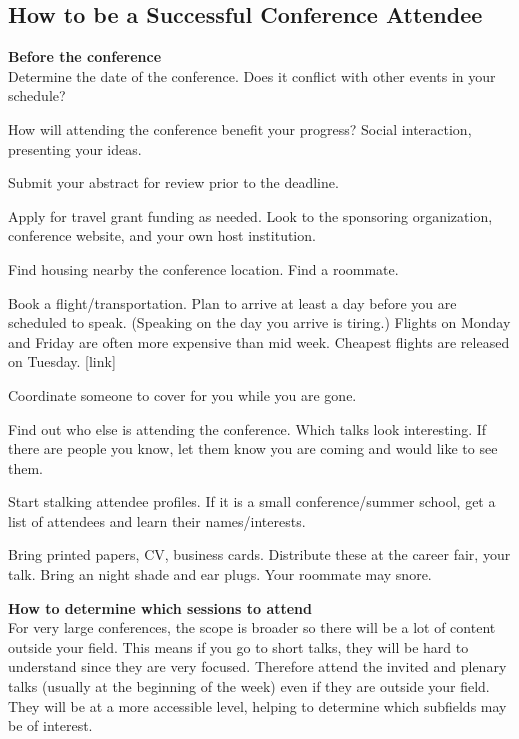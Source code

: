 \subsection{How to be a Successful Conference Attendee}



\textbf{Before the conference}\\

Determine the date of the conference. Does it conflict with other events in your schedule?

How will attending the conference benefit your progress? Social interaction, presenting your ideas.

Submit your abstract for review prior to the deadline.

Apply for travel grant funding as needed. Look to the sponsoring organization, conference website, and your own host institution.

Find housing nearby the conference location. Find a roommate.

Book a flight/transportation. Plan to arrive at least a day before you are scheduled to speak. (Speaking on the day you arrive is tiring.) Flights on Monday and Friday are often more expensive than mid week. Cheapest flights are released on Tuesday. [link]

Coordinate someone to cover for you while you are gone.

Find out who else is attending the conference. Which talks look interesting. If there are people you know, let them know you are coming and would like to see them.

Start stalking attendee profiles. If it is a small conference/summer school, get a list of attendees and learn their names/interests.

Bring printed papers, CV, business cards. Distribute these at the career fair, your talk. Bring an night shade and ear plugs. Your roommate may snore.

\textbf{How to determine which sessions to attend}\\

For very large conferences, the scope is broader so there will be a lot of content outside your field. This means if you go to short talks, they will be hard to understand since they are very focused. Therefore attend the invited and plenary talks (usually at the beginning of the week) even if they are outside your field. They will be at a more accessible level, helping to determine which subfields may be of interest.

